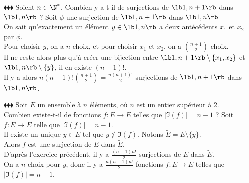 \documentclass[11pt]{article}
\begin{document}
\begin{exercice}{$\blacklozenge\blacklozenge\blacklozenge$}{}
    Soient $n\in\N^*$. Combien y a-t-il de surjections de $\lb1,n+1\rb$ dans $\lb1,n\rb$ ?
    \tcblower
    Soit $\phi$ une surjection de $\lb1,n+1\rb$ dans $\lb1,n\rb$\\
    On sait qu'exactement un élément $y\in\lb1,n\rb$ a deux antécédents $x_1$ et $x_2$ par $\phi$.\\
    Pour choisir $y$, on a $n$ choix, et pour choisir $x_1$ et $x_2$, on a $\binom{n+1}{2}$ choix.\\
    Il ne reste alors plus qu'à créer une bijection entre $\lb1,n+1\rb\setminus\{x_1,x_2\}$ et $\lb1,n\rb\setminus\{y\}$, il en existe $(n-1)!$.\\
    Il y a alors $n(n-1)!\binom{n+1}{2}=\frac{n(n+1)!}{2}$ surjections de $\lb1,n+1\rb$ dans $\lb1,n\rb$.
\end{exercice}

\begin{exercice}{$\blacklozenge\blacklozenge\blacklozenge$}{}
    Soit $E$ un ensemble à $n$ éléments, où $n$ est un entier supérieur à 2.\\
    Combien existe-t-il de fonctions $f:E\to E$ telles que $|\Im(f)|=n-1$ ?
    \tcblower
    Soit $f:E\to E$ telle que $|\Im(f)|=n-1$.\\
    Il existe un unique $y\in E$ tel que $y\notin\Im(f)$. Notons $\tilde{E}=E\setminus\{y\}$.\\
    Alors $f$ est une surjection de $E$ dans $\tilde{E}$.\\
    D'après l'exercice précédent, il y a $\frac{(n-1)n!}{2}$ surjections de $E$ dans $\tilde{E}$.\\
    On a $n$ choix pour $y$, donc il y a $\frac{n(n-1)n!}{2}$ fonctions $f:E\to E$ telles que $|\Im(f)|=n-1$.
\end{exercice}
\end{document}

